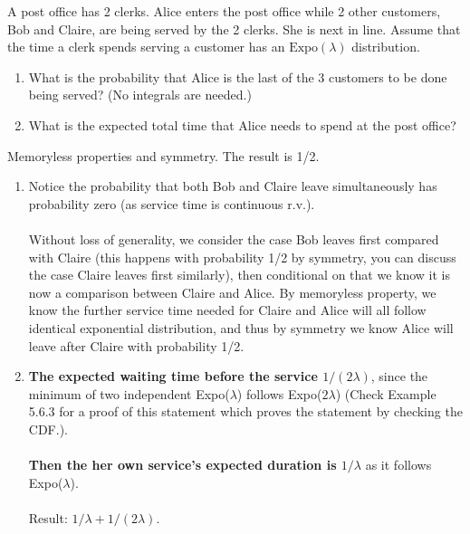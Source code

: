 

\setcounter{theorem}{35}
\begin{exercise}[BH.5.36] A post office has 2 clerks. Alice enters the post office while 2 other customers, Bob and Claire, are being served by the 2 clerks. She is next in line. Assume that the time a clerk spends serving a customer has an $\text{Expo}(\lambda)$ distribution.
	\begin{enumerate}
		\item What is the probability that Alice is the last of the 3 customers to be done being served? (No integrals are needed.)
		\item What is the expected total time that Alice needs to spend at the post office?
	\end{enumerate}
\begin{hint}
    Memoryless properties and symmetry. The result is 1/2.
\end{hint}
\begin{solution}
    \begin{enumerate}
	    \item Notice the probability that both Bob and Claire leave simultaneously has probability zero (as service time is continuous r.v.). 
    	\\~\\
    	Without loss of generality, we consider the case Bob leaves first compared with Claire (this happens with probability 1/2 by symmetry, you can discuss the case Claire leaves first similarly), then conditional on that we know it is now a comparison between Claire and Alice. By memoryless property, we know the further service time needed for Claire and Alice will all follow identical exponential distribution, and thus by symmetry we know Alice will leave after Claire with probability 1/2.    
        \item \textbf{The expected  waiting time before the service $1/(2\lambda)$}, since the minimum of two independent Expo($\lambda$) follows Expo($2\lambda$) (Check Example 5.6.3 for a proof of this statement which proves the statement by checking the CDF.). \\~\\
    	\textbf{Then the her own service's expected duration is $1/\lambda$ }as it follows Expo($\lambda$). \\~\\
    	Result: $1/\lambda+1/(2\lambda)$.
	\end{enumerate}
\end{solution}
\end{exercise}


